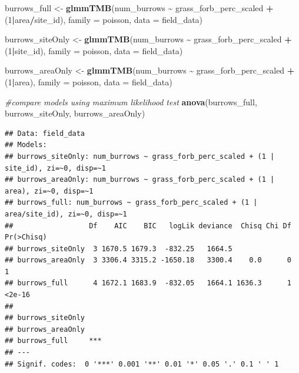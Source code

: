 \documentclass[
]{article}
\newenvironment{Shaded}{\begin{snugshade}}{\end{snugshade}}
\newcommand{\AttributeTok}[1]{\textcolor[rgb]{0.13,0.29,0.53}{#1}}
\newcommand{\CommentTok}[1]{\textcolor[rgb]{0.56,0.35,0.01}{\textit{#1}}}
\newcommand{\DecValTok}[1]{\textcolor[rgb]{0.00,0.00,0.81}{#1}}
\newcommand{\FunctionTok}[1]{\textcolor[rgb]{0.13,0.29,0.53}{\textbf{#1}}}
\newcommand{\NormalTok}[1]{#1}
\newcommand{\OtherTok}[1]{\textcolor[rgb]{0.56,0.35,0.01}{#1}}
\newcommand{\SpecialCharTok}[1]{\textcolor[rgb]{0.81,0.36,0.00}{\textbf{#1}}}
\begin{document}
\begin{Shaded}
\begin{Highlighting}[]
\NormalTok{burrows\_full }\OtherTok{\textless{}{-}} \FunctionTok{glmmTMB}\NormalTok{(num\_burrows }\SpecialCharTok{\textasciitilde{}}\NormalTok{ grass\_forb\_perc\_scaled }\SpecialCharTok{+} 
\NormalTok{                             (}\DecValTok{1}\SpecialCharTok{|}\NormalTok{area}\SpecialCharTok{/}\NormalTok{site\_id),}
                           \AttributeTok{family =}\NormalTok{ poisson, }
                           \AttributeTok{data =}\NormalTok{ field\_data)}

\NormalTok{burrows\_siteOnly }\OtherTok{\textless{}{-}} \FunctionTok{glmmTMB}\NormalTok{(num\_burrows }\SpecialCharTok{\textasciitilde{}}\NormalTok{ grass\_forb\_perc\_scaled }\SpecialCharTok{+} 
\NormalTok{                             (}\DecValTok{1}\SpecialCharTok{|}\NormalTok{site\_id),}
                           \AttributeTok{family =}\NormalTok{ poisson, }
                           \AttributeTok{data =}\NormalTok{ field\_data)}

\NormalTok{burrows\_areaOnly }\OtherTok{\textless{}{-}} \FunctionTok{glmmTMB}\NormalTok{(num\_burrows }\SpecialCharTok{\textasciitilde{}}\NormalTok{ grass\_forb\_perc\_scaled }\SpecialCharTok{+} 
\NormalTok{                             (}\DecValTok{1}\SpecialCharTok{|}\NormalTok{area),}
                           \AttributeTok{family =}\NormalTok{ poisson, }
                           \AttributeTok{data =}\NormalTok{ field\_data)}


\CommentTok{\#compare models using maximum likelihood test}
\FunctionTok{anova}\NormalTok{(burrows\_full, burrows\_siteOnly, burrows\_areaOnly)}
\end{Highlighting}
\end{Shaded}

\begin{verbatim}
## Data: field_data
## Models:
## burrows_siteOnly: num_burrows ~ grass_forb_perc_scaled + (1 | site_id), zi=~0, disp=~1
## burrows_areaOnly: num_burrows ~ grass_forb_perc_scaled + (1 | area), zi=~0, disp=~1
## burrows_full: num_burrows ~ grass_forb_perc_scaled + (1 | area/site_id), zi=~0, disp=~1
##                  Df    AIC    BIC   logLik deviance  Chisq Chi Df Pr(>Chisq)
## burrows_siteOnly  3 1670.5 1679.3  -832.25   1664.5                         
## burrows_areaOnly  3 3306.4 3315.2 -1650.18   3300.4    0.0      0          1
## burrows_full      4 1672.1 1683.9  -832.05   1664.1 1636.3      1     <2e-16
##                     
## burrows_siteOnly    
## burrows_areaOnly    
## burrows_full     ***
## ---
## Signif. codes:  0 '***' 0.001 '**' 0.01 '*' 0.05 '.' 0.1 ' ' 1
\end{verbatim}
\end{document}
